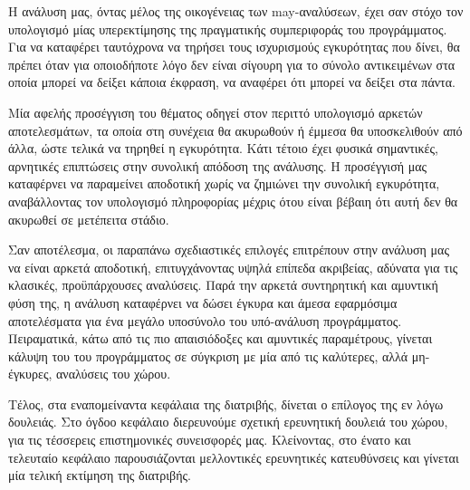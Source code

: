 Η ανάλυση μας, όντας μέλος της οικογένειας των {\en may}-αναλύσεων, έχει σαν στόχο τον υπολογισμό μίας υπερεκτίμησης της πραγματικής συμπεριφοράς του προγράμματος. Για να καταφέρει ταυτόχρονα να τηρήσει τους ισχυρισμούς εγκυρότητας που δίνει, θα πρέπει όταν για οποιοδήποτε λόγο δεν είναι σίγουρη για το σύνολο αντικειμένων στα οποία μπορεί να δείξει κάποια έκφραση, να αναφέρει ότι μπορεί να δείξει στα πάντα.

Μία αφελής προσέγγιση του θέματος οδηγεί στον περιττό υπολογισμό αρκετών αποτελεσμάτων, τα οποία στη συνέχεια θα ακυρωθούν ή έμμεσα θα υποσκελιθούν από άλλα, ώστε τελικά να τηρηθεί η εγκυρότητα. Κάτι τέτοιο έχει φυσικά σημαντικές, αρνητικές επιπτώσεις στην \mbox{συνολική} απόδοση της ανάλυσης. Η προσέγγισή μας καταφέρνει να παραμείνει αποδοτική χωρίς να ζημιώνει την συνολική εγκυρότητα, αναβάλλοντας τον υπολογισμό πληροφορίας μέχρις ότου είναι βέβαιη ότι αυτή δεν θα ακυρωθεί σε μετέπειτα στάδιο.

Σαν αποτέλεσμα, οι παραπάνω σχεδιαστικές επιλογές επιτρέπουν στην ανάλυση μας να είναι αρκετά αποδοτική, επιτυγχάνοντας υψηλά επίπεδα ακριβείας, αδύνατα για τις κλασικές, προϋπάρχουσες αναλύσεις. Παρά την αρκετά συντηρητική και αμυντική φύση της, η ανάλυση καταφέρνει να δώσει έγκυρα και άμεσα εφαρμόσιμα αποτελέσματα για ένα μεγάλο υποσύνολο του υπό-ανάλυση προγράμματος. Πειραματικά, κάτω από τις πιο απαισιόδοξες και αμυντικές παραμέτρους, γίνεται κάλυψη του {\en {}} του προγράμματος σε σύγκριση με μία από τις καλύτερες, αλλά μη-έγκυρες, αναλύσεις του χώρου.


\vspace{5 mm}
Τέλος, στα εναπομείναντα κεφάλαια της διατριβής, δίνεται ο επίλογος της εν λόγω δουλειάς. Στο όγδοο κεφάλαιο διερευνούμε σχετική ερευνητική δουλειά του χώρου, για τις τέσσερεις επιστημονικές συνεισφορές μας. Κλείνοντας, στο ένατο και τελευταίο κεφάλαιο παρουσιάζονται μελλοντικές ερευνητικές κατευθύνσεις και γίνεται μία τελική εκτίμηση της διατριβής.